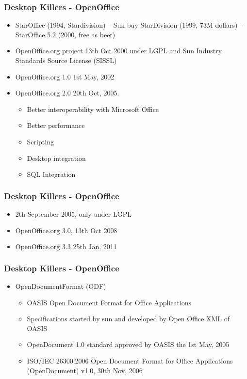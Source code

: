 \documentclass{beamer}
\begin{document}
\begin{frame}
\frametitle{Desktop Killers - OpenOffice}

\begin{itemize}
\item StarOffice (1994, Stardivision) -- Sun buy StarDivision (1999, 73M dollars) -- StarOffice 5.2 (2000, free as beer) 
\item OpenOffice.org project 13th Oct 2000 under LGPL and Sun Industry Standards Source License (SISSL)
\item OpenOffice.org 1.0 1st May, 2002
\item OpenOffice.org 2.0 20th Oct, 2005. 
	\begin{itemize}
	\item Better interoperability with Microsoft Office
	\item Better performance
	\item Scripting
	\item Desktop integration
	\item SQL Integration
	\end{itemize}
\end{itemize}

\end{frame}


\begin{frame}
\frametitle{Desktop Killers - OpenOffice}

\begin{itemize}
\item 2th September 2005, only under LGPL
\item OpenOffice.org 3.0, 13th Oct 2008
\item OpenOffice.org 3.3 25th Jan, 2011
\end{itemize}

\end{frame}



\begin{frame}
\frametitle{Desktop Killers - OpenOffice}

\begin{itemize}
\item OpenDocumentFormat (ODF)
	\begin{itemize}
	\item OASIS Open Document Format for Office Applications
	\item Specifications started by sun and developed by Open Office XML of OASIS
	\item OpenDocument 1.0 standard approved  by OASIS the 1st May, 2005
	\item ISO/IEC 26300:2006 Open Document Format for Office Applications (OpenDocument) v1.0, 30th Nov, 2006
	\end{itemize}
\end{itemize}
\end{frame}
\end{document}
